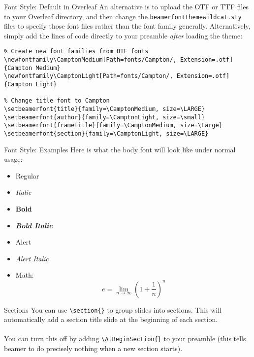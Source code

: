 \documentclass[aspectratio=1610]{beamer}
\begin{document}
\begin{frame}[fragile]{Font Style: Default in Overleaf}
    An alternative is to upload the OTF or TTF files to your Overleaf directory, and then change the \texttt{beamerfontthemewildcat.sty} files to specify those font files rather than the font family generally. Alternatively, simply add the lines of code directly to your preamble \textit{after} loading the theme:
    \footnotesize
    \begin{verbatim}
% Create new font families from OTF fonts
\newfontfamily\CamptonMedium[Path=fonts/Campton/, Extension=.otf]{Campton Medium}
\newfontfamily\CamptonLight[Path=fonts/Campton/, Extension=.otf]{Campton Light}

% Change title font to Campton
\setbeamerfont{title}{family=\CamptonMedium, size=\LARGE}
\setbeamerfont{author}{family=\CamptonLight, size=\small}
\setbeamerfont{frametitle}{family=\CamptonMedium, size=\Large}
\setbeamerfont{section}{family=\CamptonLight, size=\LARGE}
    \end{verbatim}
\end{frame}

\begin{frame}{Font Style: Examples}
    Here is what the body font will look like under normal usage:
    \begin{itemize}
        \item Regular
        \item \textit{Italic}
        \item \textbf{Bold}
        \item \textbf{\textit{Bold Italic}}
        \item \alert{Alert}
        \item \alert{\textit{Alert Italic}}
        \item Math: $$e = \lim_{n \rightarrow \infty}\left(1+\frac{1}{n}\right)^{n}$$
    \end{itemize}
\end{frame}

\begin{frame}{Sections}
    You can use \texttt{\textbackslash section\{\}} to group slides into sections. This will automatically add a section title slide at the beginning of each section.
    \\ ~ \\
    You can turn this off by adding \texttt{\textbackslash AtBeginSection\{\}} to your preamble (this tells beamer to do precisely nothing when a new section starts).
\end{frame}
\end{document}
